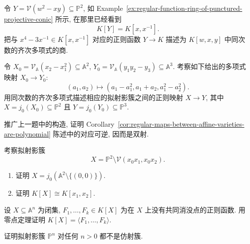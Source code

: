 \BookExerciseHeading
\begin{BookExercises}
  \item\label{ex:laurent-polynomial-on-projective-conic-as-homogeneous-quotient} 令 $Y=\mathcal{V}(w^{2}-xy)\subseteq\mathbb{P}^{2}$, 如 Example~\ref{ex:regular-function-ring-of-punctured-projective-conic} 所示, 在那里已经看到
  \[
    K[Y]=K[x,x^{-1}].
  \]
  把与 $x^{4}-3x^{-1}\in K[x,x^{-1}]$ 对应的正则函数 $Y\to K$ 描述为 $K[w,x,y]$ 中同次数的齐次多项式的商.
  \item\label{ex:homogenize-polynomial-map-between-affine-curves-and-surfaces} 令 $X_{0}=\mathcal{V}_{\mathbb{A}}(x_{2}-x_{1}^{2})\subseteq\mathbb{A}^{2}$, $Y_{0}=\mathcal{V}_{\mathbb{A}}(y_{1}y_{2}-y_{3})\subseteq\mathbb{A}^{3}$. 考察如下给出的多项式映射 $X_{0}\to Y_{0}$:
  \[
    (a_{1},a_{2})\mapsto(a_{1}-a_{1}^{2},a_{1}+a_{2},a_{1}^{2}-a_{2}^{2}).
  \]
  用同次数的齐次多项式描述相应的拟射影簇之间的正则映射 $X\to Y$, 其中 $X=j_{0}(X_{0})\subseteq\mathbb{P}^{2}$ 且 $Y=j_{0}(Y_{0})\subseteq\mathbb{P}^{3}$.
  \item\label{ex:affine-polynomial-map-correspondence-is-bijective} 推广上一题中的构造, 证明 Corollary~\ref{cor:regular-maps-between-affine-varieties-are-polynomial} 陈述中的对应可逆, 因而是双射.
  \item\label{ex:punctured-affine-plane-as-projective-open-and-its-function-ring} 考察拟射影簇
  \[
    X=\mathbb{P}^{2}\setminus\mathcal{V}(x_{0}x_{1},x_{0}x_{2}).
  \]
  \begin{enumerate}
    \item 证明 $X=j_{0}(\mathbb{A}^{2}\setminus\{(0,0)\})$.
    \item 证明 $K[X]\cong K[x_{1},x_{2}]$.
  \end{enumerate}
  \item\label{ex:regular-functions-with-no-common-zero-generate-unit} 设 $X\subseteq\mathbb{A}^{n}$ 为闭集, $F_{1},\ldots,F_{k}\in K[X]$ 为在 $X$ 上没有共同消没点的正则函数. 用零点定理证明 $K[X]=\langle F_{1},\ldots,F_{k}\rangle$.
  \item\label{ex:positive-dimensional-projective-space-is-not-affine} 证明拟射影簇 $\mathbb{P}^{n}$ 对任何 $n>0$ 都不是仿射簇.
\end{BookExercises}
